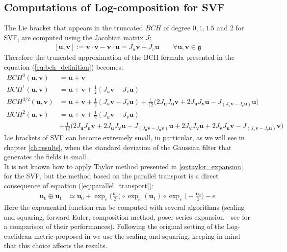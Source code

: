 \subsection{Computations of Log-composition for SVF}\label{se:log_composition_SVF}
The Lie bracket that appears in the truncated $BCH$ of degree $0,1,1.5$ and $2$ for SVF, are computed using the Jacobian matrix $J$:
\begin{align}\label{eq:jacobian_product}
[\mathbf{u},\mathbf{v}] 
:= 
\mathbf{v} \cdot \mathbf{v} - \mathbf{v} \cdot\mathbf{u}  
= 
J_{u}\mathbf{v} - J_{v}\mathbf{u}  
\qquad
\forall \mathbf{u},\mathbf{v} \in \mathfrak{g}
\end{align}
Therefore the truncated approximation of the BCH formula presented in the equation (\ref{eq:bch_definition}) becomes:
\begin{align*}
BCH^{0}(\mathbf{u},\mathbf{v}) &= \mathbf{u} + \mathbf{v} \\
BCH^{1}(\mathbf{u},\mathbf{v}) &=  \mathbf{u} + \mathbf{v} + \frac{1}{2}(J_{u}\mathbf{v} - J_{v}\mathbf{u}  )\\
BCH^{3/2}(\mathbf{u},\mathbf{v}) 
&=  
\mathbf{u} + \mathbf{v} + \frac{1}{2}(J_{u}\mathbf{v} - J_{v}\mathbf{u}  ) + 
\frac{1}{12}\big( 
2 J_{\mathbf{u}} J_{\mathbf{u}}\mathbf{v} +2 J_{\mathbf{u}} J_{\mathbf{v}}\mathbf{u}
- 
J_{(J_{u}\mathbf{v} - J_{v}\mathbf{u} )}\mathbf{u} 
\big) 
\\
BCH^{2}(\mathbf{u},\mathbf{v}) 
&=  
\mathbf{u} + \mathbf{v} + \frac{1}{2}(J_{u}\mathbf{v} - J_{v}\mathbf{u}) 
\\
&+ 
\frac{1}{12}\big( 
2 J_{\mathbf{u}} J_{\mathbf{u}}\mathbf{v} +2 J_{\mathbf{u}} J_{\mathbf{v}}\mathbf{u}
- 
J_{(J_{\mathbf{u}}\mathbf{v} - J_{\mathbf{u}}\mathbf{v})}\mathbf{u} 
+
2 J_{\mathbf{v}} J_{\mathbf{v}}\mathbf{u} +2 J_{\mathbf{v}} J_{\mathbf{u}}\mathbf{v}
- 
J_{(J_{u}\mathbf{v} - J_{v}\mathbf{u})}\mathbf{v} 
\big) 
\end{align*}
Lie brackets of SVF can become extremely small, in particular, as we will see in chapter \ref{ch:results}, when the standard deviation of the Gaussian filter that generates the fields is small. \\
It is not known how to apply Taylor method presented in \ref{se:taylor_expansion} for the SVF, but the method based on the parallel transport is a direct consequence of equation (\ref{eq:parallel_transport}):
\begin{align*}
\mathbf{u}_0\oplus \mathbf{u}_1
&\simeq
\mathbf{u}_0 
+
\exp_{e}\big(\frac{\mathbf{u}_0}{2}\big)   
\circ  \exp_{e}(\mathbf{u}_1) 
\circ \exp_{e}\big(-\frac{\mathbf{u}_0}{2}\big)
-
e
\end{align*}
Here the exponential function can be computed with several algorithms (scaling and squaring, forward Euler, composition method, poser series expansion - see \cite{bossa2008algorithms} for a comparison of their performances). Following the original setting of the Log-euclidean metric proposed in \cite{arsigny2006log} we use the scaling and squaring, keeping in mind that this choice affects the results.








